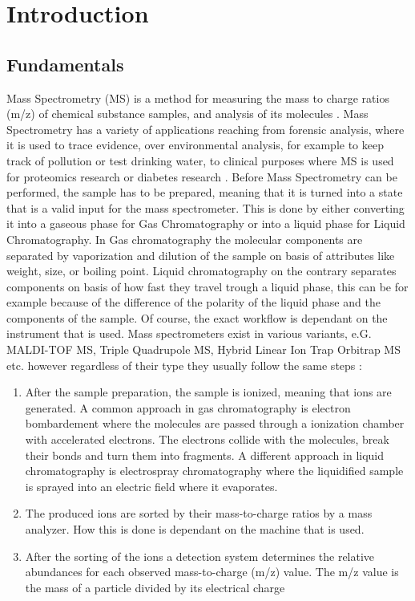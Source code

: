 \documentclass[11pt]{article}
\begin{document}
\tableofcontents
\newpage

\newpage\null\thispagestyle{empty}\newpage

\section{Introduction}
\subsection{Fundamentals}
Mass Spectrometry (MS) is a method for measuring the mass to charge ratios (m/z) of chemical substance samples, and analysis of its molecules \cite{mass-specrometer}. Mass Spectrometry has a variety of applications \cite{ms-applications} reaching from forensic analysis, where it is used to trace evidence, over environmental analysis, for example to keep track of pollution or test drinking water, to clinical purposes where MS is used for proteomics research or diabetes research \cite{ms-diabetes}.
Before Mass Spectrometry can be performed, the sample has to be prepared, meaning that it is turned into a state that is a valid input for the mass spectrometer. This is done by either converting it into a gaseous phase for Gas Chromatography or into a liquid phase for Liquid Chromatography. In Gas chromatography the molecular components are separated by vaporization and dilution of the sample on basis of attributes like weight, size, or boiling point. Liquid chromatography on the contrary separates components on basis of how fast they travel trough a liquid phase, this can be for example because of the difference of the polarity of the liquid phase and the components of the sample. Of course, the exact workflow is dependant on the instrument that is used. Mass spectrometers exist in various variants, e.G. MALDI-TOF MS, Triple Quadrupole MS, Hybrid Linear Ion Trap Orbitrap MS etc.  \cite{mass-specrometer-types} however regardless of their type they usually follow the same steps \cite{mass-specrometer, what-is-mass-spectrometry}:

\begin{enumerate}
\item After the sample preparation, the sample is ionized, meaning that ions are generated. A common approach in gas chromatography is electron bombardement where the molecules are passed through a ionization chamber with accelerated electrons. The electrons collide with the molecules, break their bonds and turn them into fragments. A different approach in liquid
chromatography is electrospray chromatography where the liquidified sample is sprayed into an electric field where it evaporates.
\item The produced ions are sorted by their mass-to-charge ratios by a mass analyzer. How this is done is dependant on the machine that is used.
\item After the sorting of the ions a detection system determines the relative abundances for each observed mass-to-charge (m/z) value. The m/z value is the mass of a particle divided by its electrical charge
\end{enumerate} 
\end{document}
